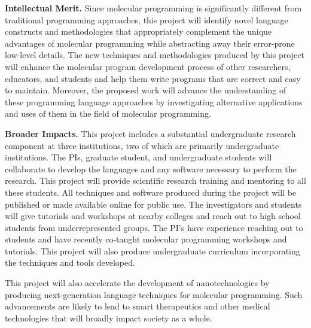 \documentclass[11pt]{article}
\begin{document}
    \textbf{Intellectual Merit.}
    Since molecular programming is significantly different from traditional programming approaches, this project will identify novel language constructs and methodologies that appropriately complement the unique advantages of molecular programming while abstracting away their error-prone low-level details.
    The new techniques and methodologies produced by this project will enhance the molecular program development process of other researchers, educators, and students and help them write programs that are correct and easy to maintain.
    Moreover, the proposed work will advance the understanding of these programming language approaches by investigating alternative applications and uses of them in the field of molecular programming.

    \textbf{Broader Impacts.}
    This project includes a substantial undergraduate research component at three institutions, two of which are primarily undergraduate institutions.
    The PIs, graduate student, and undergraduate students will collaborate to develop the languages and any software necessary to perform the research.
    This project will provide scientific research training and mentoring to all these students.
    All techniques and software produced during the project will be published or made available online for public use.
    The investigators and students will give tutorials and workshops at nearby colleges and reach out to high school students from underrepresented groups.
    The PI's have experience reaching out to students and have recently co-taught molecular programming workshops and tutorials.
    This project will also produce undergraduate curriculum incorporating the techniques and tools developed.

    This project will also accelerate the development of nanotechnologies by producing next-generation language techniques for molecular programming.
    Such advancements are likely to lead to smart therapeutics and other medical technologies that will broadly impact society as a whole.
\end{document}
